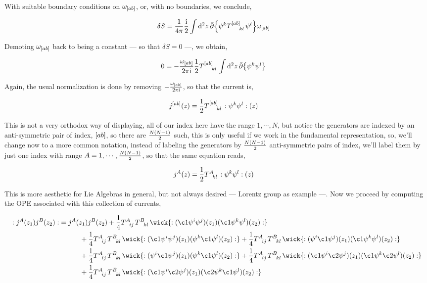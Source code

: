 With suitable boundary conditions on $\omega_{\qty[ab]}$, or, with no boundaries, we conclude,

\begin{align*}
    \delta S&=\frac{1}{4\pi}\frac\im 2\int\dd[2]{z}\bar\partial\qty{\psi^k\tensor{T}{^{\qty[ab]}_k_l}\psi^l}\omega_{\qty[ab]}
\end{align*}

Demoting $\omega_{\qty[ab]}$ back to being a constant --- so that $\delta S=0$ ---, we obtain,

\begin{align*}
    0&=-\frac{\omega_{\qty[ab]}}{2\pi\im}\frac1 2\tensor{T}{^{\qty[ab]}_k_l}\int\dd[2]{z}\bar\partial\qty{\psi^k\psi^l}
\end{align*}

Again, the usual normalization is done by removing $-\frac{\omega_{\qty[ab]}}{2\pi\textnormal{i}}$, so that the current is,

\begin{align*}
    j^{\qty[ab]}\qty(z)&=\frac1 2\tensor{T}{^{\qty[ab]}_k_l}\cnord{\psi^k\psi^l}\qty(z)
\end{align*}

This is not a very orthodox way of displaying, all of our index here have the range $1,\cdots, N$, but notice the generators are indexed by an 
anti-symmetric pair of index, $\qty[ab]$, so there are $\frac{N\qty(N-1)}{2}$ such, this is only useful if we work in the fundamental representation, 
so, we'll change now to a more common notation, instead of labeling the generators by $\frac{N\qty(N-1)}{2}$ anti-symmetric pairs of index, we'll 
label them by just one index with range $A=1,\cdots , \frac{N\qty(N-1)}{2}$, so that the same equation reads,

\begin{align*}
    j^A\qty(z)&=\frac1 2\tensor{T}{^A_k_l}\cnord{\psi^k\psi^l}\qty(z)
\end{align*}

This is more aesthetic for Lie Algebras in general, but not always desired --- Lorentz group as example ---. Now we proceed by computing the 
OPE associated with this collection of currents,

\begin{align*}
    \cnord{j^A\qty(z_1)j^B\qty(z_2)}&=j^A\qty(z_1)j ^B\qty(z_2)+\frac14\tensor{T}{^A_{ij}}\tensor{T}{^B_{kl}}\wick{\cnord{(\c1\psi^i\psi^j)\qty(z_1)(\c1\psi^k\psi^l)\qty(z_2)}}\\
    &\quad\quad\quad+\frac14\tensor{T}{^A_{ij}}\tensor{T}{^B_{kl}}\wick{\cnord{(\c1\psi^i\psi^j)\qty(z_1)(\psi^k\c1\psi^l)\qty(z_2)}}+\frac14\tensor{T}{^A_{ij}}\tensor{T}{^B_{kl}}\wick{\cnord{(\psi^i\c1\psi^j)\qty(z_1)(\c1\psi^k\psi^l)\qty(z_2)}}\\
    &\quad\quad\quad+\frac14\tensor{T}{^A_{ij}}\tensor{T}{^B_{kl}}\wick{\cnord{(\psi^i\c1\psi^j)\qty(z_1)(\psi^k\c1\psi^l)\qty(z_2)}}+\frac14\tensor{T}{^A_{ij}}\tensor{T}{^B_{kl}}\wick{\cnord{(\c1\psi^i\c2\psi^j)\qty(z_1)(\c1\psi^k\c2\psi^l)\qty(z_2)}}\\
    &\quad\quad\quad+\frac14\tensor{T}{^A_{ij}}\tensor{T}{^B_{kl}}\wick{\cnord{(\c1\psi^i\c2\psi^j)\qty(z_1)(\c2\psi^k\c1\psi^l)\qty(z_2)}}
\end{align*}

